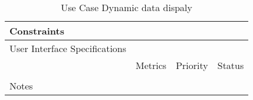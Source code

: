 \begin{table}[H]
\begin{tabularx}{\linewidth}{|l|X|X|X|}
    \hline Constraints                   & \multicolumn{3}{l|}{}                                                                                 \\

    \hline User Interface Specifications & \multicolumn{3}{l|}{}                                                                                 \\

    \hline \multirow{2}{*}{}             & Metrics                                                                           & Priority & Status \\
    \cline{2-4}                          &                                                                                   &          &        \\
    \hline Notes                         & \multicolumn{3}{l|}{}                                                                                 \\
    \hline
  \end{tabularx}
  \caption{Use Case Dynamic data dispaly}
  \label{tab:use_case_dynamic_data_dispaly}
\end{table}

